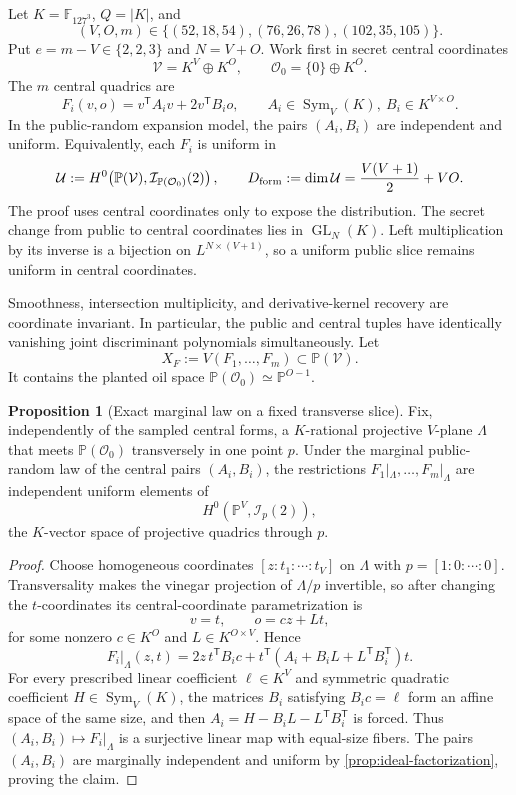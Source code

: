 \documentclass[11pt,a4paper]{article}
\theoremstyle{definition}
\newtheorem{proposition}[theorem]{Proposition}
\theoremstyle{remark}
\newcommand{\F}{\mathbb F}
\newcommand{\PP}{\mathbb P}
\newcommand{\cO}{\mathcal O}
\newcommand{\cU}{\mathcal U}
\newcommand{\cV}{\mathcal V}
\newcommand{\Sym}{\operatorname{Sym}}
\begin{document}
Let $K=\F_{127^3}$, $Q=|K|$, and
\[
(V,O,m)\in\{(52,18,54),(76,26,78),(102,35,105)\}.
\]
Put $e=m-V\in\{2,2,3\}$ and $N=V+O$.  Work first in secret central coordinates
\[
\cV=K^V\oplus K^O,
\qquad
\cO_0=\{0\}\oplus K^O.
\]
The $m$ central quadrics are
\begin{equation}\label{eq:central-slice}
F_i(v,o)=v^{\mathsf T}A_i v+2v^{\mathsf T}B_i o,
\qquad
A_i\in\Sym_V(K),\ B_i\in K^{V\times O}.
\end{equation}
In the public-random expansion model, the pairs $(A_i,B_i)$ are independent and uniform.  Equivalently, each $F_i$ is uniform in
\[
\cU:=H^0\!\left(\PP(\cV),\mathcal I_{\PP(\cO_0)}(2)\right),
\qquad
D_{\rm form}:=\dim\cU=\frac{V(V+1)}2+VO.
\]
The proof uses central coordinates only to expose the distribution.  The secret change from public to central coordinates lies in $\operatorname{GL}_N(K)$.  Left multiplication by its inverse is a bijection on $L^{N\times(V+1)}$, so a uniform public slice remains uniform in central coordinates.

Smoothness, intersection multiplicity, and derivative-kernel recovery are coordinate invariant.  In particular, the public and central tuples have identically vanishing joint discriminant polynomials simultaneously.  Let
\[
X_F:=V(F_1,\ldots,F_m)\subset\PP(\cV).
\]
It contains the planted oil space $\PP(\cO_0)\simeq\PP^{O-1}$.

\begin{proposition}[Exact marginal law on a fixed transverse slice]\label{prop:planted-slice-law}
Fix, independently of the sampled central forms, a $K$-rational projective $V$-plane $\Lambda$ that meets $\PP(\cO_0)$ transversely in one point $p$.  Under the marginal public-random law of the central pairs $(A_i,B_i)$, the restrictions $F_1|_\Lambda,\ldots,F_m|_\Lambda$ are independent uniform elements of
\[
H^0\!\left(\PP^V,\mathcal I_p(2)\right),
\]
the $K$-vector space of projective quadrics through $p$.
\end{proposition}

\begin{proof}
Choose homogeneous coordinates $[z:t_1:\cdots:t_V]$ on $\Lambda$ with $p=[1:0:\cdots:0]$.  Transversality makes the vinegar projection of $\Lambda/p$ invertible, so after changing the $t$-coordinates its central-coordinate parametrization is
\[
v=t,\qquad o=cz+Lt,
\]
for some nonzero $c\in K^O$ and $L\in K^{O\times V}$.  Hence
\[
F_i|_\Lambda(z,t)
 =2z\,t^{\mathsf T}B_ic
  +t^{\mathsf T}\!\left(A_i+B_iL+L^{\mathsf T}B_i^{\mathsf T}\right)t.
\]
For every prescribed linear coefficient $\ell\in K^V$ and symmetric quadratic coefficient $H\in\Sym_V(K)$, the matrices $B_i$ satisfying $B_ic=\ell$ form an affine space of the same size, and then $A_i=H-B_iL-L^{\mathsf T}B_i^{\mathsf T}$ is forced.  Thus $(A_i,B_i)\mapsto F_i|_\Lambda$ is a surjective linear map with equal-size fibers.  The pairs $(A_i,B_i)$ are marginally independent and uniform by \cref{prop:ideal-factorization}, proving the claim.
\end{proof}
\end{document}
